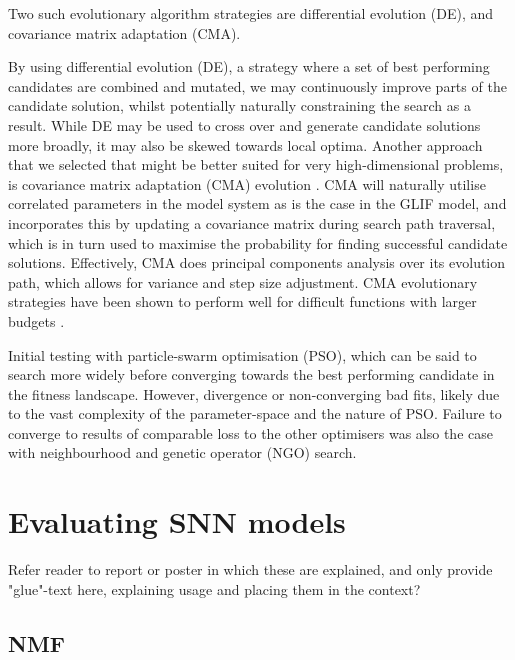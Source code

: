 \documentclass[mphil,deptreport,ai]{infthesis} %
\begin{document}
Two such evolutionary algorithm strategies are differential evolution (DE), and covariance matrix adaptation (CMA). 

By using differential evolution (DE), a strategy where a set of best performing candidates are combined and mutated, we may continuously improve parts of the candidate solution, whilst potentially naturally constraining the search as a result.
While DE may be used to cross over and generate candidate solutions more broadly, it may also be skewed towards local optima. Another approach that we selected that might be better suited for very high-dimensional problems, is covariance matrix adaptation (CMA) evolution \cite{Igel2007}. CMA will naturally utilise correlated parameters in the model system as is the case in the GLIF model, and incorporates this by updating a covariance matrix during search path traversal, which is in turn used to maximise the probability for finding successful candidate solutions.
Effectively, CMA does principal components analysis over its evolution path, which allows for variance and step size adjustment.
CMA evolutionary strategies have been shown to perform well for difficult functions with larger budgets \cite{Hansen2010}.

Initial testing with particle-swarm optimisation (PSO), which can be said to search more widely before converging towards the best performing candidate in the fitness landscape.
However, divergence or non-converging bad fits, likely due to the vast complexity of the parameter-space and the nature of PSO.
Failure to converge to results of comparable loss to the other optimisers was also the case with neighbourhood and genetic operator (NGO) search.



\section{Evaluating SNN models}

Refer reader to report or poster in which these are explained, and only provide "glue"-text here, explaining usage and placing them in the context?
\cite{Seung1999, Seung2001, Onken2016a}

\subsection{NMF}
\end{document}
